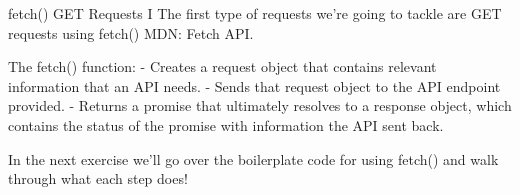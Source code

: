 fetch() GET Requests I
    The first type of requests we’re going to tackle are GET requests using fetch()
        MDN: Fetch API.

    The fetch() function:
        - Creates a request object that contains relevant information that an API needs.
        - Sends that request object to the API endpoint provided.
        - Returns a promise that ultimately resolves to a response object, which contains the status of the promise with information the API sent back.

    In the next exercise we’ll go over the boilerplate code for using fetch() and walk through what each step does!